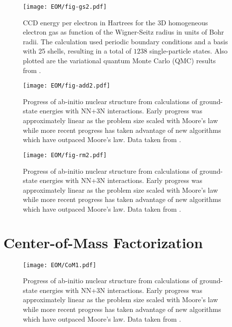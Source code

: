 \documentclass[thesis.tex]{subfiles}
\begin{document}
\begin{figure}[h]
  \texttt{[image: EOM/fig-gs2.pdf]}
  \caption{CCD energy per electron in Hartrees for the 3D homogeneous electron gas as function of the Wigner-Seitz radius in units of Bohr radii. The calculation used periodic boundary conditions and a basis with 25 shells, resulting in a total of $1238$ single-particle states. Also plotted are the variational quantum Monte Carlo (QMC) results from \cite{LOPEZ2006}.}
  \label{fig:QDground}
\end{figure}

\begin{figure}[h]
  \centering
  \texttt{[image: EOM/fig-add2.pdf]}
  \caption{Progress of ab-initio nuclear structure from calculations of ground-state energies with NN+3N interactions.  Early progress was approximately linear as the problem size scaled with Moore's law while more recent progress has taken advantage of new algorithms which have outpaced Moore's law.  Data taken from \cite{HERGERTPRIVATE}.}
  \label{fig:QDadd}
\end{figure}

\begin{figure}[h]
  \centering
  \texttt{[image: EOM/fig-rm2.pdf]}
  \caption{Progress of ab-initio nuclear structure from calculations of ground-state energies with NN+3N interactions.  Early progress was approximately linear as the problem size scaled with Moore's law while more recent progress has taken advantage of new algorithms which have outpaced Moore's law.  Data taken from \cite{HERGERTPRIVATE}.}
  \label{fig:QDrm}
\end{figure}

\section{Center-of-Mass Factorization} \label{section:CoM}

\begin{figure}[h]
  \centering
  \texttt{[image: EOM/CoM1.pdf]}
  \caption{Progress of ab-initio nuclear structure from calculations of ground-state energies with NN+3N interactions.  Early progress was approximately linear as the problem size scaled with Moore's law while more recent progress has taken advantage of new algorithms which have outpaced Moore's law.  Data taken from \cite{HERGERTPRIVATE}.}
  \label{fig:QDrm}
\end{figure}
\end{document}
